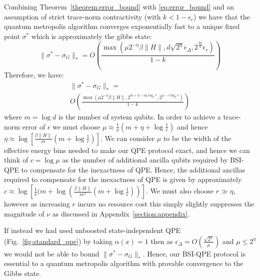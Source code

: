 \documentclass[aps,floatfix,10pt,amssymb,amsfont,amsmath,superscriptaddress,float,nofootinbib,longbibliography,nobalancelastpage,twocolumn]{revtex4-2}
\begin{document}
Combining Theorem~\ref{theorem:error_bound} with \eqref{eq:error_bound} and an assumption of strict trace-norm contractivity (with $k < 1-\epsilon_c$) we have that the quantum metropolis algorithm converges exponentially fast to a unique fixed point $\sigma^*$ which is approximately the gibbs state:
\begin{equation}
    \|\sigma^*-\sigma_G\|_* = O\left(\frac{\max( \mu 2^{-\eta}\beta\|H\|, d \sqrt{2^{\eta}}\epsilon_{\Delta}, 2^{\frac{3\eta}{2}}\epsilon_r)}{1-k}\right)
\end{equation}
Therefore, we have:
\begin{multline}
    \|\sigma^*-\sigma_G\|_* =\\ O\left(\frac{\max( \mu 2^{-\eta}\beta\|H\|, 2^{m+\eta-\nu\mu \log_2 e}, 2^{\eta-r\log_2e})}{1-k}\right)
\end{multline}
where $m = \log d$ is the number of system qubits.
In order to achieve a trace-norm error of $\epsilon$ we must choose $\mu \approx \frac{1}{\nu}(m+\eta+\log \frac{1}{\epsilon})$ and hence $\eta \approx \log \left[\frac{\beta \|H\|}{\nu\epsilon}(m + \log\frac{1}{\epsilon})\right]$. We can consider $\mu$ to be the width of the effective energy bins needed to make our QPE protocol exact, and hence we can think of $c = \log \mu$ as the number of additional ancilla qubits required by BSI-QPE to compensate for the inexactness of QPE. Hence, the additional ancillas required to compensate for the inexactness of QPE is given by approximately $c \approx \log \left[\frac{1}{\nu}(m + \log \left(\frac{\beta \|H\|}{\nu\epsilon^2}(m + \log\frac{1}{\epsilon})\right)\right]$. We must also choose $r \gg \eta$, however as increasing $r$ incurs no resource cost this simply slightly suppresses the magnitude of $\nu$ as discussed in Appendix~\ref{section:appendix}.

If instead we had used unboosted state-independent QPE (Fig.~\ref{fig:standard_qpe}) by taking $\alpha(x) =1$ then as $\epsilon_{\Delta} = O(\frac{\sqrt{2^{\eta}}}{\mu})$ and $\mu \leq 2^{\eta}$ we would not be able to bound $\|\sigma^*-\sigma_G\|_*$. Hence, our BSI-QPE protocol is essential to a quantum metropolis algorithm with provable convergence to the Gibbs state.
\end{document}
